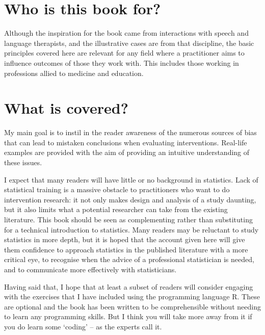 \documentclass[]{book}
\begin{document}
\hypertarget{who-is-this-book-for}{%
\section*{Who is this book for?}\label{who-is-this-book-for}}

Although the inspiration for the book came from interactions with speech and language therapists, and the illustrative cases are from that discipline, the basic principles covered here are relevant for any field where a practitioner aims to influence outcomes of those they work with. This includes those working in professions allied to medicine and education.

\hypertarget{what-is-covered}{%
\section*{What is covered?}\label{what-is-covered}}

My main goal is to instil in the reader awareness of the numerous sources of bias that can lead to mistaken conclusions when evaluating interventions. Real-life examples are provided with the aim of providing an intuitive understanding of these issues.

I expect that many readers will have little or no background in statistics. Lack of statistical training is a massive obstacle to practitioners who want to do intervention research: it not only makes design and analysis of a study daunting, but it also limits what a potential researcher can take from the existing literature. This book should be seen as complementing rather than substituting for a technical introduction to statistics. Many readers may be reluctant to study statistics in more depth, but it is hoped that the account given here will give them confidence to approach statistics in the published literature with a more critical eye, to recognise when the advice of a professional statistician is needed, and to communicate more effectively with statisticians.

Having said that, I hope that at least a subset of readers will consider engaging with the exercises that I have included using the programming language R. These are optional and the book has been written to be comprehensible without needing to learn any programming skills. But I think you will take more away from it if you do learn some `coding' -- as the experts call it.
\end{document}
